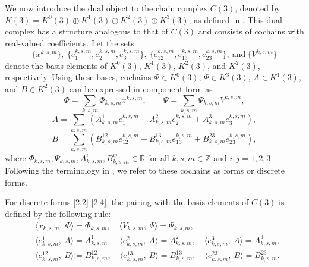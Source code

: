 \documentclass[english]{article}
\theoremstyle{plain}
\theoremstyle{definition}
\theoremstyle{remark}
\numberwithin{equation}{section}
\begin{document}
We now introduce the dual object to the chain complex $C(3)$, denoted by  $K(3)=K^0(3)\oplus K^1(3)\oplus K^2(3)\oplus K^3(3)$, as defined  in \cite{S5}. This dual complex has a structure analogous to that of
$C(3)$ and consists of cochains with real-valued coefficients.  Let the sets
 \begin{equation*}
 \{x^{k,s,m}\}, \
 \{e^{k,s,m}_1,  e^{k,s,m}_2,  e^{k,s,m}_3\}, \ \{e^{k,s,m}_{12},  e^{k,s,m}_{13},  e^{k,s,m}_{23}\}, \ \mbox{and} \ \{V^{k,s,m}\}
\end{equation*}
denote the basis elements of $K^0(3)$, $K^1(3)$, $K^2(3)$, and $K^2(3)$, respectively. Using these bases, cochains
 $\Phi\in K^0(3)$, $\Psi\in K^3(3)$, $A\in K^1(3)$, and $B\in K^2(3)$ can be expressed in component form as
  \begin{equation}\label{2.2}
  \Phi=\sum_{k,s,m}\Phi_{k,s,m}x^{k,s,m}, \qquad
   \Psi=\sum_{k,s,m}\Psi_{k,s,m}V^{k,s,m},
  \end{equation}
\begin{equation}\label{2.3}
A=\sum_{k,s,m}(A^1_{k,s,m}e_1^{k,s,m}+A^2_{k,s,m}e_2^{k,s,m}+A^3_{k,s,m}e_3^{k,s,m}),
\end{equation}
\begin{equation}\label{2.4}
B=\sum_{k,s,m}(B^{12}_{k,s,m}e_{12}^{k,s,m}+B^{13}_{k,s,m}e_{13}^{k,s,m}+B^{23}_{k,s,m}e_{23}^{k,s,m}),
\end{equation}
where  $\Phi_{k,s,m}, \Psi_{k,s,m},
A^i_{k,s,m}, B^{ij}_{k,s,m}\in {\mathbb R}$ for all $k, s,m \in {\mathbb Z}$ and $i,j=1,2,3$.
 Following the terminology in \cite{S5}, we refer to these cochains as forms or discrete forms.


For discrete forms \eqref{2.2}-\eqref{2.4}, the pairing with the basis elements of
$C(3)$ is defined by the following rule:
\begin{align}\label{2.5}
&\langle x_{k,s,m}, \ \Phi\rangle=\Phi_{k,s,m}, \quad \langle V_{k,s,m}, \ \Psi\rangle=\Psi_{k,s,m}, \nonumber \\
&\langle e_{k,s,m}^1, \ A\rangle=A^1_{k,s,m}, \quad
\langle e_{k,s,m}^2, \ A\rangle=A^2_{k,s,m},  \quad \langle e_{k,s,m}^3, \ A\rangle=A^3_{k,s,m}, \nonumber \\
&\langle e_{k,s,m}^{12}, \ B\rangle=B^{12}_{k,s,m}, \quad
\langle e_{k,s,m}^{13}, \ B\rangle=B^{13}_{k,s,m},  \quad \langle e_{k,s,m}^{23}, \ B\rangle=B^{23}_{k,s,m}.
\end{align}
\end{document}
